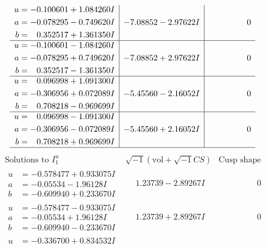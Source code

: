 \documentclass[1p]{elsarticle_modified}
\theoremstyle{definition}
\newcommand{\I}{\sqrt{-1}}
\begin{document}
$$\begin{array}{c|c|c}
\begin{aligned}
u &= -0.100601 + 1.084260 I \\
a &= -0.078295 - 0.749620 I \\
b &= \phantom{-}0.352517 + 1.361350 I\end{aligned}
 & -7.08852 - 2.97622 I & \phantom{-0.000000 } 0 \\ \hline\begin{aligned}
u &= -0.100601 - 1.084260 I \\
a &= -0.078295 + 0.749620 I \\
b &= \phantom{-}0.352517 - 1.361350 I\end{aligned}
 & -7.08852 + 2.97622 I & \phantom{-0.000000 } 0 \\ \hline\begin{aligned}
u &= \phantom{-}0.096998 + 1.091300 I \\
a &= -0.306956 + 0.072089 I \\
b &= \phantom{-}0.708218 - 0.969699 I\end{aligned}
 & -5.45560 - 2.16052 I & \phantom{-0.000000 } 0 \\ \hline\begin{aligned}
u &= \phantom{-}0.096998 - 1.091300 I \\
a &= -0.306956 - 0.072089 I \\
b &= \phantom{-}0.708218 + 0.969699 I\end{aligned}
 & -5.45560 + 2.16052 I & \phantom{-0.000000 } 0\\
 \hline 
 \end{array}$$\newpage$$\begin{array}{c|c|c}  
\text{Solutions to }I^u_{1}& \I (\text{vol} + \sqrt{-1}CS) & \text{Cusp shape}\\
 \hline 
\begin{aligned}
u &= -0.578477 + 0.933075 I \\
a &= -0.05534 - 1.96128 I \\
b &= -0.609940 + 0.233670 I\end{aligned}
 & \phantom{-}1.23739 - 2.89267 I & \phantom{-0.000000 } 0 \\ \hline\begin{aligned}
u &= -0.578477 - 0.933075 I \\
a &= -0.05534 + 1.96128 I \\
b &= -0.609940 - 0.233670 I\end{aligned}
 & \phantom{-}1.23739 + 2.89267 I & \phantom{-0.000000 } 0 \\ \hline\begin{aligned}
u &= -0.336700 + 0.834532 I \\

\end{aligned}
\end{array}$$
\end{document}
